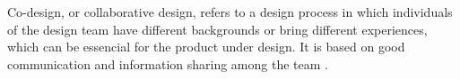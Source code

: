 Co-design, or collaborative design, refers to a design process in which individuals of the design team have different backgrounds or bring different experiences, which can be essencial for the product under design. It is based on good communication and information sharing among the team \cite{chiu2002organizational}.

%
%
